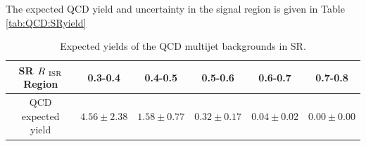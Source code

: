 \indent The expected QCD yield and uncertainty in the signal region is given in Table \ref{tab:QCD:SRyield}

\begin{table}[!h]
  \begin{center}
    \begin{tabular}{c|c|c|c|c|c} \hline\hline
SR $R_{~\mathrm{ISR}}$ Region       & 0.3-0.4              & 0.4-0.5              & 0.5-0.6              & 0.6-0.7             & 0.7-0.8 \\ \hline
QCD expected yield & $4.56\pm2.38$ & $1.58\pm0.77$ & $0.32\pm0.17$ & $0.04\pm0.02$ & $0.00\pm0.00$ \\ \hline \hline
    \end{tabular}
  \caption{Expected yields of the QCD multijet backgrounds in SR.}
  \label{tab:QCDYields}
  \end{center}
\end{table}%

